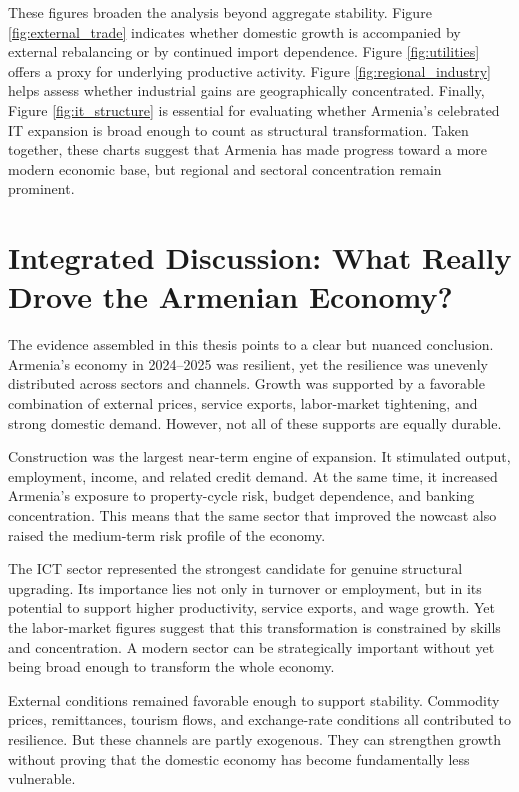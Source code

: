 \documentclass[12pt,a4paper]{report}
\begin{document}
These figures broaden the analysis beyond aggregate stability. Figure \ref{fig:external_trade} indicates whether domestic growth is accompanied by external rebalancing or by continued import dependence. Figure \ref{fig:utilities} offers a proxy for underlying productive activity. Figure \ref{fig:regional_industry} helps assess whether industrial gains are geographically concentrated. Finally, Figure \ref{fig:it_structure} is essential for evaluating whether Armenia's celebrated IT expansion is broad enough to count as structural transformation. Taken together, these charts suggest that Armenia has made progress toward a more modern economic base, but regional and sectoral concentration remain prominent.\cite{armstatbank,wbTrade2024,wbCPF2025}

\chapter{Integrated Discussion: What Really Drove the Armenian Economy?}
The evidence assembled in this thesis points to a clear but nuanced conclusion. Armenia's economy in 2024--2025 was resilient, yet the resilience was unevenly distributed across sectors and channels. Growth was supported by a favorable combination of external prices, service exports, labor-market tightening, and strong domestic demand. However, not all of these supports are equally durable.

Construction was the largest near-term engine of expansion. It stimulated output, employment, income, and related credit demand. At the same time, it increased Armenia's exposure to property-cycle risk, budget dependence, and banking concentration. This means that the same sector that improved the nowcast also raised the medium-term risk profile of the economy.

The ICT sector represented the strongest candidate for genuine structural upgrading. Its importance lies not only in turnover or employment, but in its potential to support higher productivity, service exports, and wage growth. Yet the labor-market figures suggest that this transformation is constrained by skills and concentration. A modern sector can be strategically important without yet being broad enough to transform the whole economy.

External conditions remained favorable enough to support stability. Commodity prices, remittances, tourism flows, and exchange-rate conditions all contributed to resilience. But these channels are partly exogenous. They can strengthen growth without proving that the domestic economy has become fundamentally less vulnerable.
\end{document}
